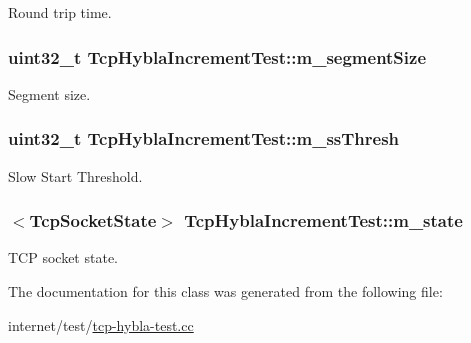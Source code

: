 Round trip time. 

\subsubsection[{\texorpdfstring{m\+\_\+segment\+Size}{m_segmentSize}}]{\setlength{\rightskip}{0pt plus 5cm}uint32\+\_\+t Tcp\+Hybla\+Increment\+Test\+::m\+\_\+segment\+Size\hspace{0.3cm}{\ttfamily [private]}}\hypertarget{classTcpHyblaIncrementTest_a5219f317f34add20fc1850a49ba89e5f}{}\label{classTcpHyblaIncrementTest_a5219f317f34add20fc1850a49ba89e5f}


Segment size. 

\subsubsection[{\texorpdfstring{m\+\_\+ss\+Thresh}{m_ssThresh}}]{\setlength{\rightskip}{0pt plus 5cm}uint32\+\_\+t Tcp\+Hybla\+Increment\+Test\+::m\+\_\+ss\+Thresh\hspace{0.3cm}{\ttfamily [private]}}\hypertarget{classTcpHyblaIncrementTest_a74b5f18cddac7c9bb6d88b3891d86f03}{}\label{classTcpHyblaIncrementTest_a74b5f18cddac7c9bb6d88b3891d86f03}


Slow Start Threshold. 

\subsubsection[{\texorpdfstring{m\+\_\+state}{m_state}}]{$<${\bf Tcp\+Socket\+State}$>$ Tcp\+Hybla\+Increment\+Test\+::m\+\_\+state\hspace{0.3cm}{\ttfamily [private]}}\hypertarget{classTcpHyblaIncrementTest_a7bdef0a2b0654dcf180e3a219a93f6e2}{}\label{classTcpHyblaIncrementTest_a7bdef0a2b0654dcf180e3a219a93f6e2}


T\+CP socket state. 



The documentation for this class was generated from the following file\+:\begin{DoxyCompactItemize}
\item 
internet/test/\hyperlink{tcp-hybla-test_8cc}{tcp-\/hybla-\/test.\+cc}\end{DoxyCompactItemize}
